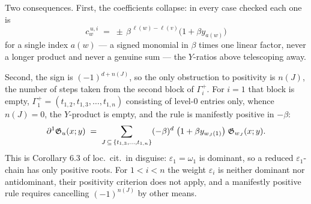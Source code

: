 \documentclass{amsart}
\theoremstyle{definition}
\theoremstyle{remark}
\numberwithin{equation}{section}
\begin{document}
Two consequences. First, the coefficients collapse: in every case checked each one is
$$c^{\,u,i}_{w}\;=\;\pm\,\beta^{\,\ell(w)-\ell(v)}\bigl(1+\beta y_{a(w)}\bigr)$$
for a single index $a(w)$ --- a signed monomial in $\beta$ times one linear factor, never a
longer product and never a genuine sum --- the $Y$-ratios above telescoping away.

Second, the sign is $(-1)^{d+n(J)}$, so the only obstruction to positivity is $n(J)$, the
number of steps taken from the second block of $\Gamma_i^{+}$. For $i=1$ that block is empty,
$\Gamma_1^{+}=(t_{1,2},t_{1,3},\dots,t_{1,n})$ consisting of level-$0$ entries only, whence
$n(J)=0$, the $Y$-product is empty, and the rule is manifestly positive in $-\beta$:
$$\partial^1\mathfrak G_u(x;y)\;=\;\sum_{J\,\subseteq\,\{t_{1,3},\dots,t_{1,n}\}}(-\beta)^{d}\;
  \bigl(1+\beta y_{w_J(1)}\bigr)\;\mathfrak G_{w_J}(x;y).$$
This is Corollary 6.3 of loc.\ cit.\ in disguise: $\varepsilon_1=\omega_1$ is dominant, so a
reduced $\varepsilon_1$-chain has only positive roots. For $1<i<n$ the weight $\varepsilon_i$
is neither dominant nor antidominant, their positivity criterion does not apply, and a
manifestly positive rule requires cancelling $(-1)^{n(J)}$ by other means.


\end{document}

